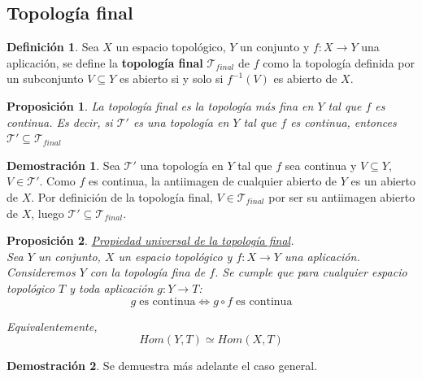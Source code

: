 \documentclass[12pt,twoside]{report}
\newcommand\mc[1]{\mathcal{#1}}
\theoremstyle{azul}
\theoremstyle{azul2}
\theoremstyle{plain}
\newtheorem*{prop}{Proposición}
\theoremstyle{definition}
\newtheorem*{defi}{Definición}
\newtheorem*{dem}{Demostración}
\theoremstyle{remark}
\begin{document}
\subsection{Topología final}\label{sec:topf}
\begin{defi}
Sea $X$ un espacio topológico, $Y$ un conjunto y $f: X \longrightarrow Y$ una aplicación, se define la \textbf{topología final} $\mc{T}_{final}$ de $f$ como la topología definida por un subconjunto $V \subseteq Y$ es abierto si y solo si $f^{-1}(V)$ es abierto de $X$.
\end{defi}
\begin{prop}
La topología final es la topología más fina en $Y$ tal que $f$ es continua. Es decir, si $\mc{T}'$ es una topología en $Y$ tal que $f$ es continua, entonces $\mc{T}'\subseteq\mc{T}_{final}$
\end{prop}
\begin{dem}
Sea $\mc{T}'$ una topología en $Y$ tal que $f$ sea continua y $V\subseteq Y$, $V\in \mc{T}'$.  Como $f$ es continua, la antiimagen de cualquier abierto de $Y$ es un abierto de $X$. Por definición de la topología final, $V\in\mc{T}_{final}$ por ser su antiimagen abierto de $X$, luego $\mc{T}'\subseteq\mc{T}_{final}$.
\end{dem}

\begin{prop} \underline{Propiedad universal de la topología final}. \\ Sea $Y$ un conjunto, $X$ un espacio topológico y $f: X \longrightarrow Y$ una aplicación. Consideremos $Y$ con la topología fina de $f$. Se cumple que para cualquier espacio topológico $T$ y toda aplicación $g:Y\longrightarrow T$:
$$g \; \text{es continua} \iff g\circ f\;\text{es continua}$$

Equivalentemente, 
$$Hom(Y,T) \simeq Hom (X,T)$$
\end{prop}
\begin{dem}
Se demuestra más adelante el caso general.
\end{dem}
\end{document}
